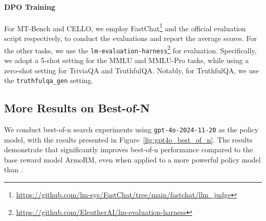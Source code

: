 \paragraph{DPO Training}
For MT-Bench and CELLO, we employ FastChat\footnote{\url{https://github.com/lm-sys/FastChat/tree/main/fastchat/llm_judge}} and the official evaluation script respectively, to conduct the evaluations and report the average scores.
For the other tasks, we use the \texttt{lm-evaluation-harness}\footnote{\url{https://github.com/EleutherAI/lm-evaluation-harness}} for evaluation. Specifically, we adopt a 5-shot setting for the MMLU and MMLU-Pro tasks, while using a zero-shot setting for TriviaQA and TruthfulQA. Notably, for TruthfulQA, we use the \texttt{truthfulqa\_gen} setting. 

\subsection{More Results on Best-of-N}
\label{sec:app_exp_more_res}
We conduct best-of-n search experiments using \texttt{gpt-4o-2024-11-20} as the policy model, with the results presented in Figure~\ref{fig:gpt4o_best_of_n}. The results demonstrate that \ourmethod significantly improves best-of-n performance compared to the base reward model ArmoRM, even when applied to a more powerful policy model than \ourmethod.




